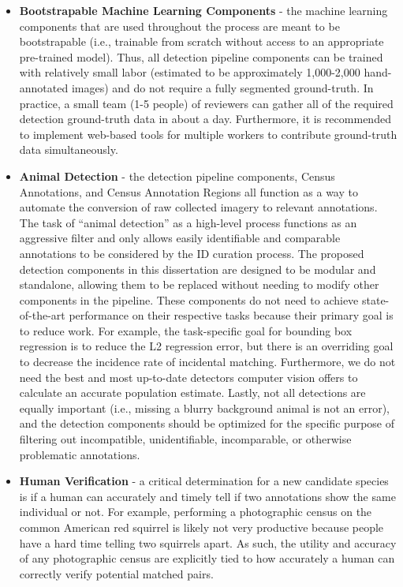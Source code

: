 \begin{itemize}
    \item \textbf{Bootstrapable Machine Learning Components} - the machine learning components that are used throughout the process are meant to be bootstrapable (i.e., trainable from scratch without access to an appropriate pre-trained model). Thus, all detection pipeline components can be trained with relatively small labor (estimated to be approximately 1,000-2,000 hand-annotated images) and do not require a fully segmented ground-truth.  In practice, a small team (1-5 people) of reviewers can gather all of the required detection ground-truth data in about a day.  Furthermore, it is recommended to implement web-based tools for multiple workers to contribute ground-truth data simultaneously.
    \item \textbf{Animal Detection} - the detection pipeline components, Census Annotations, and Census Annotation Regions all function as a way to automate the conversion of raw collected imagery to relevant annotations.  The task of ``animal detection'' as a high-level process functions as an aggressive filter and only allows easily identifiable and comparable annotations to be considered by the ID curation process.  The proposed detection components in this dissertation are designed to be modular and standalone, allowing them to be replaced without needing to modify other components in the pipeline.  These components do not need to achieve state-of-the-art performance on their respective tasks because their primary goal is to reduce work.  For example, the task-specific goal for bounding box regression is to reduce the L2 regression error, but there is an overriding goal to decrease the incidence rate of incidental matching. Furthermore, we do not need the best and most up-to-date detectors computer vision offers to calculate an accurate population estimate.  Lastly, not all detections are equally important (i.e., missing a blurry background animal is not an error), and the detection components should be optimized for the specific purpose of filtering out incompatible, unidentifiable, incomparable, or otherwise problematic annotations.
    \item \textbf{Human Verification} - a critical determination for a new candidate species is if a human can accurately and timely tell if two annotations show the same individual or not.  For example, performing a photographic census on the common American red squirrel is likely not very productive because people have a hard time telling two squirrels apart.  As such, the utility and accuracy of any photographic census are explicitly tied to how accurately a human can correctly verify potential matched pairs.

\end{itemize}
